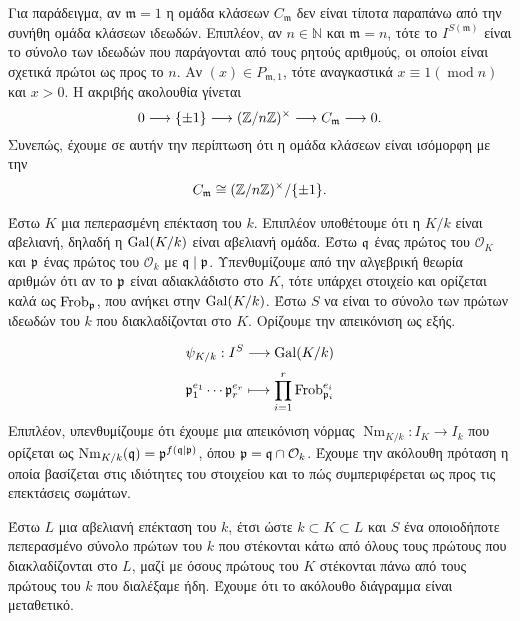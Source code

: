 \noindent Για παράδειγμα, αν $\mathfrak{m}=1$ η  ομάδα κλάσεων $C_\mathfrak{m}$ δεν είναι τίποτα παραπάνω από την συνήθη ομάδα 
κλάσεων ιδεωδών. Επιπλέον, αν $n \in \mathbb{N}$ και $\mathfrak{m} = n$, τότε το $I^{S(\mathfrak{m})}$ είναι το σύνολο των ιδεωδών που 
παράγονται από τους ρητούς αριθμούς, οι οποίοι είναι σχετικά πρώτοι ως προς το $n$. Αν $(x) \in P_{\mathfrak{m},1}$, τότε αναγκαστικά 
$x \equiv 1 (\operatorname{mod}n)$ και $x >0$. Η ακριβής ακολουθία γίνεται
$$0 \longrightarrow \{\pm 1\} \longrightarrow (\mathbb{Z}/n\mathbb{Z})^\times \longrightarrow C_\mathfrak{m} \longrightarrow 0.$$ Συνεπώς, έχουμε σε 
αυτήν την περίπτωση ότι η  ομάδα κλάσεων είναι ισόμορφη με την $$C_\mathfrak{m} \cong (\mathbb{Z}/n\mathbb{Z})^\times / \{\pm 1\}.$$


\noindent Έστω $K$ μια πεπερασμένη επέκταση  του $k$. Επιπλέον υποθέτουμε ότι η $K/k$ είναι αβελιανή, δηλαδή η $\operatorname{Gal}(K/k)$ 
είναι αβελιανή ομάδα. Έστω $\mathfrak{q}$ ένας πρώτος του $\mathcal{O}_K$ και $\mathfrak{p}$ ένας πρώτος του $\mathcal{O}_k$ με $\mathfrak{q} \mid \mathfrak{p}$. Υπενθυμίζουμε 
από την αλγεβρική θεωρία αριθμών ότι αν το $\mathfrak{p}$ είναι αδιακλάδιστο στο $K$, τότε υπάρχει  στοιχείο και ορίζεται καλά ως 
$\operatorname{Frob}_{\mathfrak{p}}$, που ανήκει στην $\operatorname{Gal}(K/k)$. Έστω $S$ να είναι το σύνολο των πρώτων ιδεωδών του $k$ που διακλαδίζονται στο $K$. 
Ορίζουμε την απεικόνιση  ως εξής.

$$\psi_{K/k} : I^S \longrightarrow \operatorname{Gal}(K/k)$$
$$ \mathfrak{p}_1^{e_1} \cdots \mathfrak{p}_r^{e_r} \longmapsto \prod\limits_{i=1}^r \operatorname{Frob}_{\mathfrak{p}_i}^{e_i}$$ Επιπλέον, υπενθυμίζουμε ότι 
έχουμε μια απεικόνιση νόρμας $\operatorname{Nm}_{K/k} : I_K \longrightarrow I_k$ που ορίζεται ως $\operatorname{Nm}_{K/k}(\mathfrak{q}) = 
\mathfrak{p}^{f(\mathfrak{q} \mid \mathfrak{p})}$, όπου $\mathfrak{p} = \mathfrak{q} \cap \mathcal{O}_k$. Έχουμε την ακόλουθη πρόταση η οποία βασίζεται στις ιδιότητες του στοιχείου 
 και το πώς συμπεριφέρεται ως προς τις επεκτάσεις σωμάτων.

\begin{prop}
    Έστω $L$ μια αβελιανή επέκταση του $k$, έτσι ώστε $k\subset K \subset L$ και $S$ ένα οποιοδήποτε πεπερασμένο σύνολο πρώτων του $k$ 
    που στέκονται κάτω από όλους τους πρώτους που διακλαδίζονται στο $L$, μαζί με όσους πρώτους του $K$ στέκονται πάνω από τους 
    πρώτους του $k$ που διαλέξαμε ήδη. Έχουμε ότι το ακόλουθο διάγραμμα είναι μεταθετικό.
\end{prop}
\begin{figure}[H]
    \centering
\end{figure}

